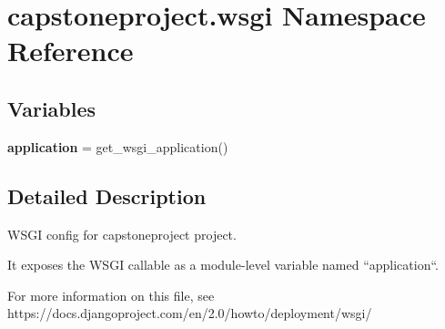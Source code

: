 \hypertarget{namespacecapstoneproject_1_1wsgi}{}\section{capstoneproject.\+wsgi Namespace Reference}
\label{namespacecapstoneproject_1_1wsgi}
\subsection*{Variables}
\begin{DoxyCompactItemize}
\item 
\mbox{\label{namespacecapstoneproject_1_1wsgi_ad9f2b1e3bfa7b96db38b008a0654fa1b}} 
{\bfseries application} = get\+\_\+wsgi\+\_\+application()
\end{DoxyCompactItemize}


\subsection{Detailed Description}
\begin{DoxyVerb}WSGI config for capstoneproject project.

It exposes the WSGI callable as a module-level variable named ``application``.

For more information on this file, see
https://docs.djangoproject.com/en/2.0/howto/deployment/wsgi/
\end{DoxyVerb}
 